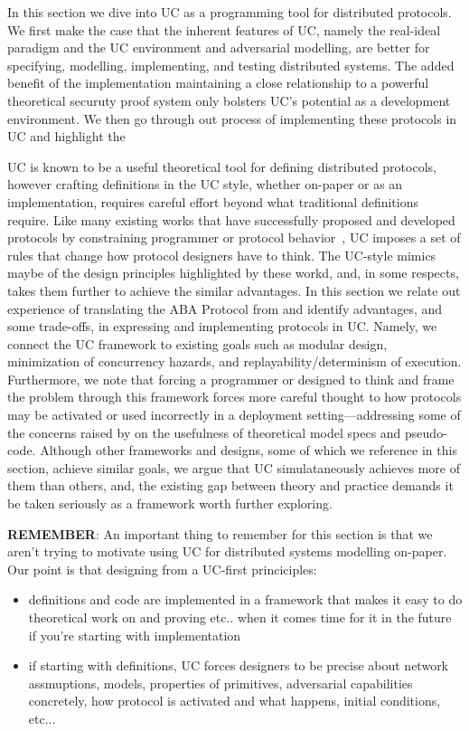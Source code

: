 In this section we dive into UC as a programming tool for distributed protocols.
We first make the case that the inherent features of UC, namely the real-ideal paradigm and the UC environment and adversarial modelling, are better for specifying, modelling, implementing, and testing distributed systems.
The added benefit of the implementation maintaining a close relationship to a powerful theoretical securuty proof system only bolsters UC's potential as a development environment.
We then go through out process of implementing these protocols in UC and highlight the 


UC is known to be a useful theoretical tool for defining distributed protocols, however crafting definitions in the UC style, whether on-paper or as an implementation, requires careful effort beyond what traditional definitions require.
Like many existing works that have successfully proposed and developed protocols by constraining programmer or protocol behavior~\cite{mace,macemc,farsite,farsiteretro,dbug}, UC imposes a set of rules that change how protocol designers have to think. 
The UC-style mimics maybe of the design principles highlighted by these workd, and, in some respects, takes them further to achieve the similar advantages. 
In this section we relate out experience of translating the ABA Protocol from \cite{ABA} and identify advantages, and some trade-offs, in expressing and implementing protocols in UC.
Namely, we connect the UC framework to existing goals such as modular design, minimization of concurrency hazards, and replayability/determinism of execution.
Furthermore, we note that forcing a programmer or designed to think and frame the problem through this framework forces more careful thought to how protocols may be activated or used incorrectly in a deployment setting---addressing some of the concerns raised by \cite{paxosthoughts} on the usefulness of theoretical model specs and pseudo-code.
Although other frameworks and designs, some of which we reference in this section, achieve similar goals, we argue that UC simulataneously achieves more of them than others, and, the existing gap between theory and practice demands it be taken seriously as a framework worth further exploring.

\textbf{REMEMBER}: An important thing to remember for this section is that we aren't trying to motivate using UC for distributed systems modelling on-paper.
Our point is that designing from a UC-first princiciples:
\begin{itemize} 
\item definitions and code are implemented in a framework that makes it easy to do theoretical work on and proving etc.. when it comes time for it in the future if you're starting with implementation
\item if starting with definitions, UC forces designers to be precise about network assmuptions, models, properties of primitives, adversarial capabilities concretely, how protocol is activated and what happens, initial conditions, etc...
\end{itemize}

